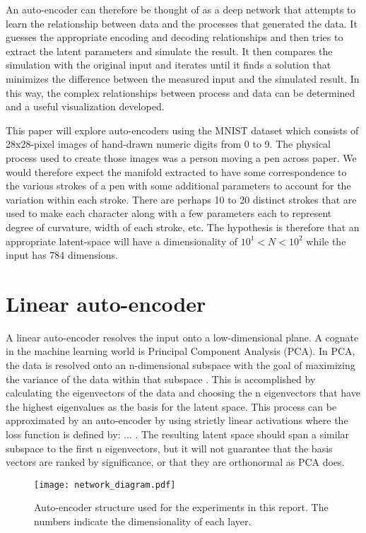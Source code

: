 \documentclass{article}
\begin{document}
An auto-encoder can therefore be thought of as a deep network that attempts to learn the relationship between data and the processes that generated the data. It guesses the appropriate encoding and decoding relationships and then tries to extract the latent parameters and simulate the result. It then compares the simulation with the original input and iterates until it finds a solution that minimizes the difference between the measured input and the simulated result. In this way, the complex relationships between process and data can be determined and a useful visualization developed.

This paper will explore auto-encoders using the MNIST dataset which consists of 28x28-pixel images of hand-drawn numeric digits from 0 to 9. The physical process used to create those images was a person moving a pen across paper. We would therefore expect the manifold extracted to have some correspondence to the various strokes of a pen with some additional parameters to account for the variation within each stroke. There are perhaps 10 to 20 distinct strokes that are used to make each character along with a few parameters each to represent degree of curvature, width of each stroke, etc. The hypothesis is therefore that an appropriate latent-space will have a dimensionality of $10^1 < N < 10^2$ while the input has 784 dimensions.

\section{Linear auto-encoder}
A linear auto-encoder resolves the input onto a low-dimensional plane. A cognate in the machine learning world is Principal Component Analysis (PCA). In PCA, the data is resolved onto an n-dimensional subspace with the goal of maximizing the variance of the data within that subspace \cite{hoover}. This is accomplished by calculating the eigenvectors of the data and choosing the n eigenvectors that have the highest eigenvalues as the basis for the latent space. This process can be approximated by an auto-encoder by using strictly linear activations where the loss function is defined by: ... . The resulting latent space should span a similar subspace to the first n eigenvectors, but it will not guarantee that the basis vectors are ranked by significance, or that they are orthonormal as PCA does. 

\begin{figure}[h]
\label{fig:network_diagram}
\begin{center}
\texttt{[image: network\_diagram.pdf]} 
\caption{Auto-encoder structure used for the experiments in this report. The numbers indicate the dimensionality of each layer.}
\end{center}
\end{figure}
\end{document}
